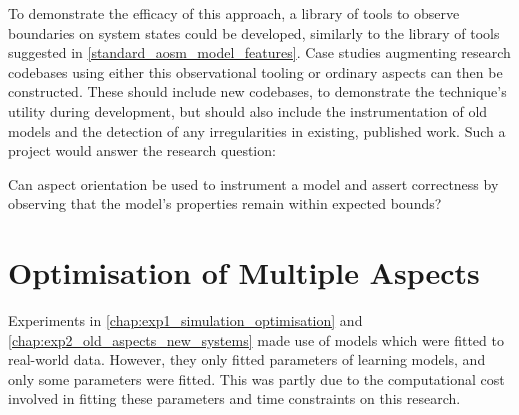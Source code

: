 To demonstrate the efficacy of this approach, a library of tools to observe
boundaries on system states could be developed, similarly to the library of
tools suggested in \cref{standard_aosm_model_features}. Case studies augmenting
research codebases using either this observational tooling or ordinary aspects
can then be constructed. These should include new codebases, to demonstrate the
technique's utility during development, but should also include the
instrumentation of old models and the detection of any irregularities in
existing, published work. Such a project would answer the research question:

\begin{researchquestion}
    Can aspect orientation be used to instrument a model and assert correctness
    by observing that the model's properties remain within expected bounds?
\end{researchquestion}








\section{Optimisation of Multiple
Aspects}\label{future_work_many_aspectual_models_to_optimise}

Experiments in \cref{chap:exp1_simulation_optimisation} and
\cref{chap:exp2_old_aspects_new_systems} made use of models which were fitted to
real-world data. However, they only fitted parameters of learning models, and
only some parameters were fitted. This was partly due to the
computational cost involved in fitting these parameters and time constraints on
this research.

